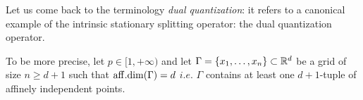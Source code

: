 
\smallskip Let us come back to the terminology {\em dual quantization}: it refers to   a canonical example
of the intrinsic stationary splitting operator: the dual quantization operator.

\smallskip To be more precise,  
let $p\!\in[1,+\infty)$ and let $\Gamma=\{x_1,\ldots,x_n\}\subset \mathbb{R}^d$ be a
grid of size $n\ge d+1$ such that  ${\rm aff.dim}(\Gamma) =  d$ $i.e.$ $\Gamma$ contains at least one $d+1$-tuple of  affinely independent points.



